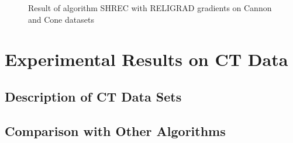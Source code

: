 \begin{figure}[tb]
	\caption{Result of algorithm SHREC with RELIGRAD gradients on Cannon and Cone datasets}
	\label{fig:cannon_cone}
\end{figure}
\section{Experimental Results on CT Data}

\subsection{Description of CT Data Sets}

\subsection{Comparison with Other Algorithms}
